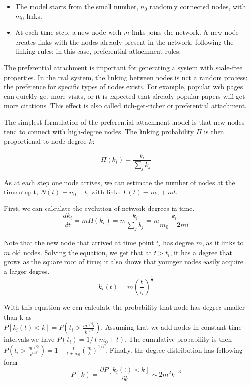 \begin{itemize}
	\item The model starts from the small number, $n_0$ randomly connected nodes, with $m_0$ links.
	\item At each time step, a new node with $m$ links joins the network. A new node creates links with the nodes already present in the network, following the linking rules; in this case, preferential attachment rules. 
\end{itemize}

The preferential attachment is important for generating a system with scale-free properties. In the real system, the linking between nodes is not a random process; the preference for specific types of nodes exists. For example, popular web pages can quickly get more visits, or it is expected that already popular papers will get more citations. This effect is also called rich-get-richer or preferential attachment.

The simplest formulation of the preferential attachment model is that new nodes tend to connect with high-degree nodes. The linking probability $\Pi$ is then proportional to node degree $k$:  

\begin{equation}
\Pi(k_i) = \frac{k_i}{\sum_jk_j} 
\end{equation} 

As at each step one node arrives, we can estimate the number of nodes at the time step t, $N(t) = n_0+t$, with links $L(t) =m_0+ mt$. 

First, we can calculate the evolution of network degrees in time.
\begin{equation}
\frac{dk_i}{dt} = m\Pi(k_i) = m\frac{k_i}{\sum_jk_j} = m\frac{k_i}{m_0 + 2mt}
\end{equation}

Note that the new node that arrived at time point $t_i$ has degree $m$, as it links to $m$ old nodes. Solving the equation, we get that at $t>t_i$, it has a degree that grows as the square root of time; it also shows that younger nodes easily acquire a larger degree. 
\begin{equation}
k_i(t) = m \left(\frac{t}{t_i}\right)^{\frac{1}{2}}
\end{equation}

With this equation we can calculate the probability that node has degree smaller than k  as \\ $P[k_i(t)<k] = P(t_i > \frac{m^{1/\beta}t}{k^{1/\beta}})$. Assuming that we add nodes in constant time intervals we have $P(t_i) = 1/(m_0+t)$. The cumulative probability is then  $P(t_i>\frac{m^{1/\beta t}}{k^{1/\beta}}) = 1 - \frac{t}{t+m_0}\left(\frac{m}{k}\right)^{1/\beta} $.
Finally, the degree distribution has following form
\begin{equation}
P(k) = \frac{\partial P[k_i(t)<k]}{ \partial k} \sim 2m^2 k^{-3} 
\end{equation}

